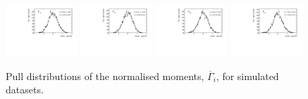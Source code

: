 \begin{figure}
\includegraphics[width=0.24\textwidth]{figs/kpimm/angular-analysis/toys/pull_m_38.pdf}
\includegraphics[width=0.24\textwidth]{figs/kpimm/angular-analysis/toys/pull_m_39.pdf}
\includegraphics[width=0.24\textwidth]{figs/kpimm/angular-analysis/toys/pull_m_40.pdf}
\includegraphics[width=0.24\textwidth]{figs/kpimm/angular-analysis/toys/pull_m_41.pdf}
\caption{Pull distributions of the normalised moments, $\overline{\Gamma}_{i}$, for simulated datasets.}
\label{fig:appendix:kpimm:angular-analysis:toys:pulls:2}
\end{figure}